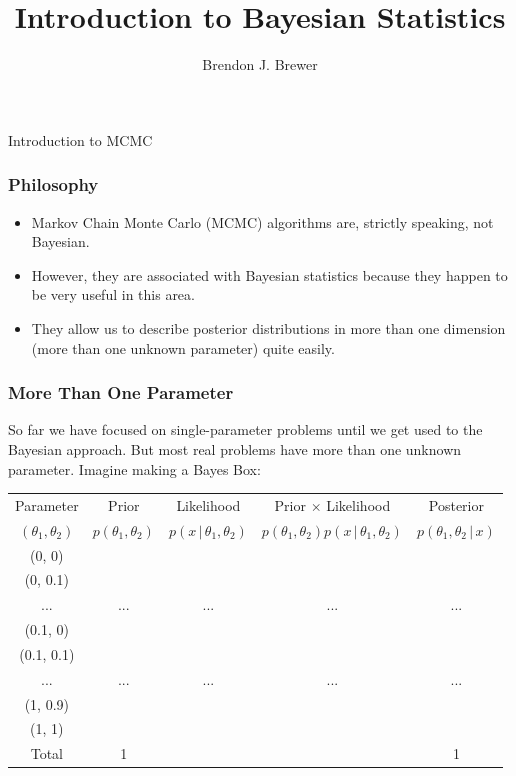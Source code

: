 \documentclass{beamer}
\author{Brendon J. Brewer}
\title{Introduction to Bayesian Statistics}
\institute{Summer Institute in Statistical Genomics \\
The University of Auckland, November 2026}
\date{}
\newcommand{\given}{\,|\,}
\begin{document}
\frame{\titlepage}


\begin{frame}
\begin{center}
\Large
Introduction to MCMC
\end{center}

\end{frame}

\begin{frame}
\frametitle{Philosophy}
\begin{itemize}
\item Markov Chain Monte Carlo (MCMC) algorithms are, strictly speaking, not
Bayesian.\pause
\item However, they are associated with Bayesian statistics because they happen
to be very useful in this area.\pause
\item They allow us to describe posterior distributions in more than one
dimension (more than one unknown parameter) quite easily.
\end{itemize}
\end{frame}

\begin{frame}
\frametitle{More Than One Parameter}
So far we have focused on single-parameter problems until we get used to the
Bayesian approach. But most real problems have more than one unknown parameter.
Imagine making a Bayes Box:
\begin{center}
{\tiny
\begin{tabular}{|c|c|c|c|c|}
\hline
Parameter & Prior & Likelihood & Prior $\times$ Likelihood & Posterior \\
$(\theta_1, \theta_2)$  & $p(\theta_1, \theta_2)$ & $p(x \given \theta_1, \theta_2)$ & $p(\theta_1, \theta_2)p(x\given\theta_1, \theta_2)$ & $p(\theta_1, \theta_2\given x)$ \\
\hline
(0, 0) &  &  & & \\
(0, 0.1) &  &  & & \\
... & ... & ... & ... & ... \\
(0.1, 0) &  &  & & \\
(0.1, 0.1) & & & & \\
... & ... & ... & ... & ... \\
(1, 0.9) & & & & \\
(1, 1) & & & & \\
\hline
Total & 1 & & & 1 \\
\hline
\end{tabular}
} %
\end{center}

\end{frame}
\end{document}
